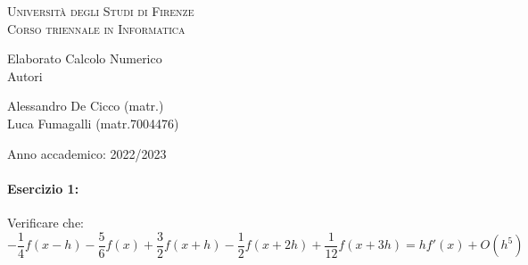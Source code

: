 \documentclass[12pt]{article}
\begin{document}
\begin{titlepage}
\centering

\vspace*{20mm}
\textsc{\LARGE Università degli Studi di Firenze}\\[0.5cm]
\textsc{\Large Corso triennale in Informatica}\\[0.5cm]

\vspace{20mm}

\huge Elaborato Calcolo Numerico\\[0.5cm]

\vspace{20mm}
\small Autori

\Large Alessandro De Cicco (matr.) \\ Luca Fumagalli (matr.7004476)\\[0.5cm]

\vspace{10mm}

\large Anno accademico: 2022/2023\\[0.5cm]

\end{titlepage}

\paragraph{Esercizio 1:}
Verificare che:
$$ -\frac{1}{4}f(x-h)-\frac{5}{6}f(x)+\frac{3}{2}f(x+h)-\frac{1}{2}f(x+2h)+\frac{1}{12}f(x+3h)=hf'(x) + O(h^5)$$
\end{document}
